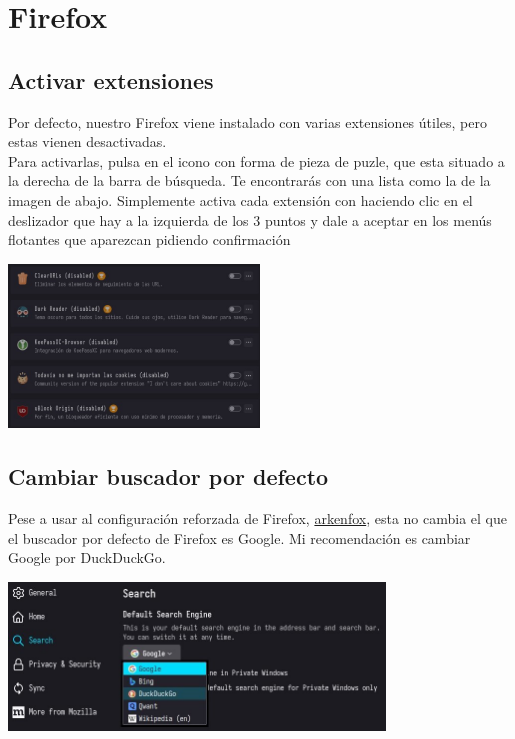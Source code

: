 \documentclass[12pt]{article}
\begin{document}
\section{Firefox}

\subsection{Activar extensiones}

\begin{multicols}{2}
\begin{minipage}[t]{0.45\textwidth}
Por defecto, nuestro Firefox viene instalado con varias extensiones útiles, pero estas vienen desactivadas.
\vspace{10pt}\\
Para activarlas, pulsa en el icono con forma de pieza de puzle, que esta situado a la derecha de la barra de búsqueda. Te encontrarás con una lista como la de la imagen de abajo. Simplemente activa cada extensión con haciendo clic en el deslizador que hay a la izquierda de los 3 puntos y dale a aceptar en los menús flotantes que aparezcan pidiendo confirmación
\end{minipage}%
\hfill\includegraphics[width=0.5\textwidth]{images/extensions.jpg}
\end{multicols}

\begin{center}
	
\end{center}

\subsection{Cambiar buscador por defecto}

Pese a usar al configuración reforzada de Firefox, \href{https://github.com/arkenfox/user.js}{arkenfox}, esta no cambia el que el buscador por defecto de Firefox es Google. Mi recomendación es cambiar Google por DuckDuckGo.

\begin{center}
	\includegraphics[width=0.75\textwidth]{images/search-engine.jpg}
\end{center}
\end{document}
